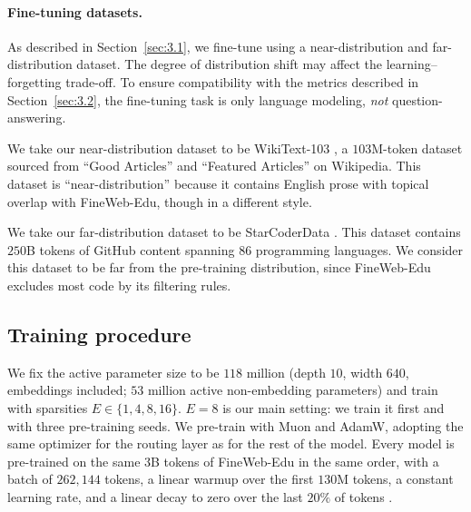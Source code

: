 \documentclass[11pt,a4paper]{article}
\begin{document}
\paragraph{Fine-tuning datasets.}
As described in Section~\ref{sec:3.1}, we fine-tune using a near-distribution and far-distribution dataset. The degree of distribution shift may affect the learning--forgetting trade-off. To ensure compatibility with the metrics described in Section~\ref{sec:3.2}, the fine-tuning task is only language modeling, \textit{not} question-answering.

We take our near-distribution dataset to be WikiText-103 \cite{merity2017iclr-pointer}, a $103$M-token dataset sourced from ``Good Articles'' and ``Featured Articles'' on Wikipedia. This dataset is ``near-distribution'' because it contains English prose with topical overlap with FineWeb-Edu, though in a different style.

We take our far-distribution dataset to be StarCoderData \cite{li2023starcoder}. This dataset contains $250$B tokens of GitHub content spanning $86$ programming languages. We consider this dataset to be far from the pre-training distribution, since FineWeb-Edu excludes most code by its filtering rules. 

\subsection{Training procedure}
We fix the active parameter size to be $118$ million (depth $10$, width $640$, embeddings included; $53$ million active non-embedding parameters) and train with sparsities $E \in \{1,4,8,16\}$. $E=8$ is our main setting: we train it first and with three pre-training seeds. We pre-train with Muon and AdamW, adopting the same optimizer for the routing layer as for the rest of the model. Every model is pre-trained on the same $3$B tokens of FineWeb-Edu in the same order, with a batch of $262{,}144$ tokens, a linear warmup over the first $130$M tokens, a constant learning rate, and a linear decay to zero over the last $20\%$ of tokens \cite{ludziejewski2025jointmoescalinglaws}. 
\end{document}

